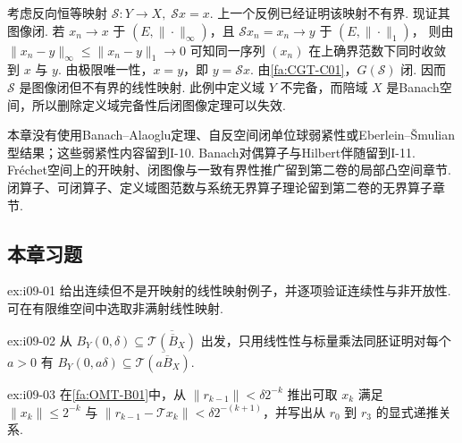 \begin{FACounterexample}[删除定义域完备性后闭图像定理可失效]\label{i09:ce-incomplete-cgt}
考虑反向恒等映射
\(\displaystyle \mathcal S:Y\to X, \; \mathcal Sx=x\).
上一个反例已经证明该映射不有界. 现证其图像闭. 若 \(\displaystyle x_n\to x\) 于 \(\displaystyle (E,\|\cdot\|_\infty)\)，且 \(\displaystyle \mathcal Sx_n=x_n\to y\) 于 \(\displaystyle (E,\|\cdot\|_1)\)，
则由
\(\displaystyle \|x_n-y\|_\infty\leqslant\|x_n-y\|_1\to0\)
可知同一序列 \(\displaystyle (x_n)\) 在上确界范数下同时收敛到 \(\displaystyle x\) 与 \(\displaystyle y\). 由极限唯一性，\(\displaystyle x=y\)，即 \(\displaystyle y=\mathcal Sx\). 由\autoref{fa:CGT-C01}，\(\displaystyle G(\mathcal S)\) 闭. 因而 \(\displaystyle \mathcal S\) 是图像闭但不有界的线性映射. 此例中定义域 \(\displaystyle Y\) 不完备，而陪域 \(\displaystyle X\) 是Banach空间，所以删除定义域完备性后闭图像定理可以失效.
\end{FACounterexample}

\begin{FAWarning}[后续理论边界]
本章没有使用Banach--Alaoglu定理、自反空间闭单位球弱紧性或Eberlein--Šmulian型结果；这些弱紧性内容留到I-10. Banach对偶算子与Hilbert伴随留到I-11. Fréchet空间上的开映射、闭图像与一致有界性推广留到第二卷的局部凸空间章节. 闭算子、可闭算子、定义域图范数与系统无界算子理论留到第二卷的无界算子章节.
\end{FAWarning}

\subsection{本章习题}\label{sec:i09-exercises}

\begin{FAExercise}[开映射定义]{ex:i09-01}
给出连续但不是开映射的线性映射例子，并逐项验证连续性与非开放性. 可在有限维空间中选取非满射线性映射.
\end{FAExercise}

\begin{FAExercise}[开映射定量球包含引理的缩放步骤]{ex:i09-02}
从 \(\displaystyle B_Y(0,\delta)\subseteq\overline{\mathcal T(\overline B_X)}\) 出发，只用线性性与标量乘法同胚证明对每个 \(\displaystyle a>0\) 有 \(\displaystyle B_Y(0,a\delta)\subseteq\overline{\mathcal T(a\overline B_X)}\).
\end{FAExercise}

\begin{FAExercise}[残量递推]{ex:i09-03}
在\autoref{fa:OMT-B01}中，从 \(\displaystyle \|r_{k-1}\|<\delta2^{-k}\) 推出可取 \(\displaystyle x_k\) 满足 \(\displaystyle \|x_k\|\leqslant2^{-k}\) 与 \(\displaystyle \|r_{k-1}-\mathcal T x_k\|<\delta2^{-(k+1)}\)，并写出从 \(\displaystyle r_0\) 到 \(\displaystyle r_3\) 的显式递推关系.
\end{FAExercise}


